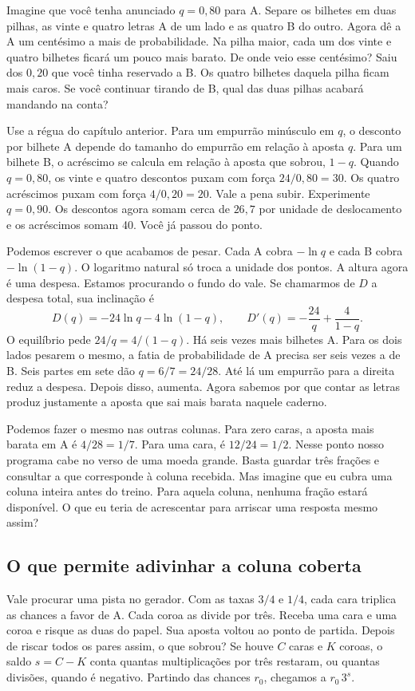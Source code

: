\documentclass[12pt,oneside]{article}
\newcommand{\secao}[1]{\Needspace{5.2\baselineskip}\subsection*{#1}}
\begin{document}
Imagine que você tenha anunciado $q=0{,}80$ para A. Separe os bilhetes em duas pilhas, as vinte e quatro letras A de um lado e as quatro B do outro. Agora dê a A um centésimo a mais de probabilidade. Na pilha maior, cada um dos vinte e quatro bilhetes ficará um pouco mais barato. De onde veio esse centésimo? Saiu dos $0{,}20$ que você tinha reservado a B. Os quatro bilhetes daquela pilha ficam mais caros. Se você continuar tirando de B, qual das duas pilhas acabará mandando na conta?

Use a régua do capítulo anterior. Para um empurrão minúsculo em $q$, o desconto por bilhete A depende do tamanho do empurrão em relação à aposta $q$. Para um bilhete B, o acréscimo se calcula em relação à aposta que sobrou, $1-q$. Quando $q=0{,}80$, os vinte e quatro descontos puxam com força $24/0{,}80=30$. Os quatro acréscimos puxam com força $4/0{,}20=20$. Vale a pena subir. Experimente $q=0{,}90$. Os descontos agora somam cerca de $26{,}7$ por unidade de deslocamento e os acréscimos somam 40. Você já passou do ponto.

Podemos escrever o que acabamos de pesar. Cada A cobra $-\ln q$ e cada B cobra $-\ln(1-q)$. O logaritmo natural só troca a unidade dos pontos. A altura agora é uma despesa. Estamos procurando o fundo do vale. Se chamarmos de $D$ a despesa total, sua inclinação é
\[
 D(q)=-24\ln q-4\ln(1-q),\qquad
 D'(q)=-\frac{24}{q}+\frac{4}{1-q}.
\]
O equilíbrio pede $24/q=4/(1-q)$. Há seis vezes mais bilhetes A. Para os dois lados pesarem o mesmo, a fatia de probabilidade de A precisa ser seis vezes a de B. Seis partes em sete dão $q=6/7=24/28$. Até lá um empurrão para a direita reduz a despesa. Depois disso, aumenta. Agora sabemos por que contar as letras produz justamente a aposta que sai mais barata naquele caderno.

Podemos fazer o mesmo nas outras colunas. Para zero caras, a aposta mais barata em A é $4/28=1/7$. Para uma cara, é $12/24=1/2$. Nesse ponto nosso programa cabe no verso de uma moeda grande. Basta guardar três frações e consultar a que corresponde à coluna recebida. Mas imagine que eu cubra uma coluna inteira antes do treino. Para aquela coluna, nenhuma fração estará disponível. O que eu teria de acrescentar para arriscar uma resposta mesmo assim?

\secao{O que permite adivinhar a coluna coberta}
Vale procurar uma pista no gerador. Com as taxas $3/4$ e $1/4$, cada cara triplica as chances a favor de A. Cada coroa as divide por três. Receba uma cara e uma coroa e risque as duas do papel. Sua aposta voltou ao ponto de partida. Depois de riscar todos os pares assim, o que sobrou? Se houve $C$ caras e $K$ coroas, o saldo $s=C-K$ conta quantas multiplicações por três restaram, ou quantas divisões, quando é negativo. Partindo das chances $r_0$, chegamos a $r_0\,3^s$.
\end{document}
